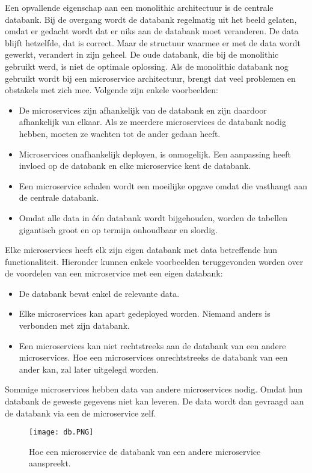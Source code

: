 Een opvallende eigenschap aan een monolithic architectuur is de centrale databank. Bij de overgang wordt de databank regelmatig uit het beeld gelaten, omdat er gedacht wordt dat er niks aan de databank moet veranderen. De data blijft hetzelfde, dat is correct. Maar de structuur waarmee er met de data wordt gewerkt, verandert in zijn geheel. De oude databank, die bij de monolithic gebruikt werd, is niet de optimale oplossing. 
Als de monolithic databank nog gebruikt wordt bij een microservice architectuur, brengt dat veel problemen en obstakels met zich mee. Volgende zijn enkele voorbeelden:
\begin{itemize}
	\item De microservices zijn afhankelijk van de databank en zijn daardoor afhankelijk van elkaar. Als ze meerdere microservices de databank nodig hebben, moeten ze wachten tot de ander gedaan heeft.
	\item Microservices onafhankelijk deployen, is onmogelijk. Een aanpassing heeft invloed op de databank en elke microservice kent de databank. 
	\item Een microservice schalen wordt een moeilijke opgave omdat die vasthangt aan de centrale databank. 
	\item Omdat alle data in één databank wordt bijgehouden, worden de tabellen gigantisch groot en op termijn onhoudbaar en slordig. 
\end{itemize}

Elke microservices heeft elk zijn eigen databank met data betreffende hun functionaliteit. Hieronder kunnen enkele voorbeelden teruggevonden worden over de voordelen van een microservice met een eigen databank:
\begin{itemize}
	\item De databank bevat enkel de relevante data.
	\item Elke microservices kan apart gedeployed worden. Niemand anders is verbonden met zijn databank.
	\item Een microservices kan niet rechtstreeks aan de databank van een andere microservices. Hoe een microservices onrechtstreeks de databank van een ander kan, zal later uitgelegd worden.
\end{itemize}

Sommige microservices hebben data van andere microservices nodig. Omdat hun databank de geweste gegevens niet kan leveren. De data wordt dan gevraagd aan de databank via een de microservice zelf.
\begin{figure}[h!]
	\texttt{[image: db.PNG]}
	\centering
	\caption{Hoe een microservice de databank van een andere microservice aanspreekt.}
\end{figure}
 
